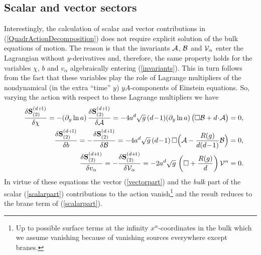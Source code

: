 \documentclass[a4paper,12pt]{article}
\newcommand{\za}{{\alpha}}   %
\newcommand{\ddim}{{d}}
\newcommand{\DDim}{{(d+\!1)}}
\newcommand{\ddy}{{\partial_y}}
\newcommand{\bBox}{\square}  %
\begin{document}
\subsection{Scalar and vector sectors}
\hspace{\parindent}Interestingly, the calculation of scalar and
vector contributions in (\ref{QuadrActionDecomposition}) does not
require explicit solution of the bulk equations of motion. The
reason is that the invariants $\mathcal{A}$, $\mathcal{B}$ and $\mathcal{V}_\alpha$ enter the
Lagrangian without $y$-derivatives and, therefore, the same
property holds for the variables $\chi$, $b$ and $v_\za$
algebraically entering (\ref{invariants}). This in turn follows
from the fact that these variables play the role of Lagrange
multipliers of the nondynamical (in the extra ``time'' $y$)
$yA$-components of Einstein equations. So, varying the action with
respect to these Lagrange multipliers we have
    \begin{eqnarray}
     &&\frac{\delta \mathbf{S}^\DDim_{(2)}}{\delta \chi}=
     -(\ddy\ln{a})\,\frac{\delta \mathbf{S}^\DDim_{(2)}}{\delta
     \A}=-4a^\ddim\sqrt{g}\,
     (\ddim\!-\!1)(\ddy\ln{a})\,
     \big(\bBox\B+\ddim\!\cdot\!\A\big)=0,\nonumber\\
     &&\frac{\delta \mathbf{S}^\DDim_{(2)}}{\delta b}=
     -\frac{\delta \mathbf{S}^\DDim_{(2)}}{\delta
     \B}=-4a^\ddim\sqrt{g}\,(\ddim\!-\!1)\,
     \bBox\Big(\A-\frac{R(g)}
     {\ddim(\ddim\!-\!1)}\B\Big)=0,\nonumber\\
     &&\frac{\delta \mathbf{S}^\DDim_{(2)}}{\delta v_\za}=
     -\frac{\delta \mathbf{S}^\DDim_{(2)}}{\delta
     \V_\za}=-2a^\ddim\sqrt{g}\,
     \left(\bBox+\frac{R(g)}
     {\ddim}\right)\V^\za=0.                 \label{Constraints}
    \end{eqnarray}
In virtue of these equations the vector (\ref{vectorpart}) and the
{\em bulk} part of the scalar (\ref{scalarpart}) contributions to
the action vanish\footnote{Up to possible surface terms at the
infinity $x^\alpha$-coordinates in the bulk which we assume
vanishing because of vanishing sources everywhere except branes.}
and the result reduces to the brane term of (\ref{scalarpart}).
\end{document}
